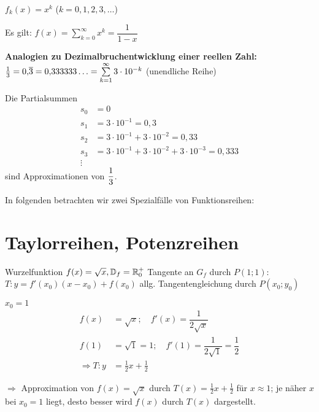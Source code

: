 \Bsp $f_k(x)=x^k$ ($k=0,1,2,3,\ldots$)
\cbox{$f(x)=\sum\limits_{k=0}^{\infty}x^k=x^0+x^1+x^2+\ldots$\\
$\D=\{x\mid |x|<1\}={]-1;1[}$}

Es gilt: $f(x)=\sum\limits_{k=0}^{\infty}x^k=\dfrac{1}{1-x}$

{\bf Analogien zu Dezimalbruchentwicklung einer reellen Zahl:}
\vspace{-0.9cm}
\Bsp $\frac{1}{3}=0{,}\overline{3}=0{,}333333\ldots=\sum\limits_{k=1}^{\infty}3\cdot10^{-k}$ (unendliche Reihe)

Die Partialsummen
\begin{align*}
s_0&=0\\
s_1&=3\cdot10^{-1}=0{,}3\\
s_2&=3\cdot10^{-1}+3\cdot10^{-2}=0{,}33\\
s_3&=3\cdot10^{-1}+3\cdot10^{-2}+3\cdot10^{-3}=0{,}333\\
\vdots
\end{align*}
sind Approximationen von $\textsl{}\dfrac{1}{3}$.

In folgenden betrachten wir zwei Spezialfälle von Funktionsreihen:

\clearpage
\section{Taylorreihen, Potenzreihen}
\Bsp Wurzelfunktion $f(x)=\sqrt{x}, \mathbb{D}_f=\mathbb{R}_0^+$
Tangente an $G_f$ durch $P(1;1)$:\\
$T: y=f'(x_0)(x-x_0)+f(x_0)$ allg. Tangentengleichung durch $P(x_0;y_0)$

\ul{$x_0=1$}
\begin{align*}
f(x)&=\sqrt{x};\quad f'(x)=\dfrac{1}{2\sqrt{x}}\\
f(1)&=\sqrt{1}=1;\quad f'(1)=\dfrac{1}{2\sqrt{1}}=\dfrac{1}{2}\\
\Rightarrow T:y&=\frac{1}{2}x+\frac{1}{2}
\end{align*}

$\Rightarrow$ Approximation von $f(x)=\sqrt{x}$ durch $T(x)=\frac{1}{2}x+\frac{1}{2}$ für $x\approx1$; je näher $x$ bei $x_0=1$ liegt, desto besser wird $f(x)$ durch $T(x)$ dargestellt.

